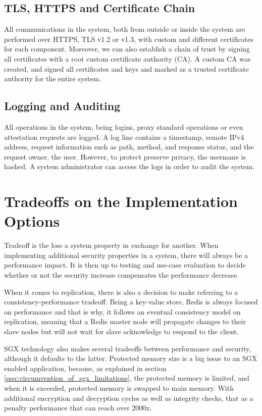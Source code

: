 \subsection{TLS, HTTPS and Certificate Chain}
\label{ssec:tls_https_certificate_chain}

All communications in the system, both from outside or inside the system are performed over \gls{HTTPS}, \gls{TLS} v1.2 or v1.3, with custom and different certificates for each component. Moreover, we can also establish a chain of trust by signing all certificates with a root custom certificate authority (\gls{CA}). A custom \gls{CA} was created, and signed all certificates and keys and marked as a trusted certificate authority for the entire system.

\subsection{Logging and Auditing} 
\label{sec:logging_and_auditing}

All operations in the system, being logins, proxy standard operations or even attestation requests are logged. A log line contains a timestamp, remote \gls{IP}v4 address, request information such as path, method, and response status, and the request owner, the user. However, to protect preserve privacy, the username is hashed. A system administrator can access the logs in order to audit the system.

\section{Tradeoffs on the Implementation Options}
\label{sec:tradeoffs_implementation_options}

Tradeoff is the loss a system property in exchange for another. When implementing additional security properties in a system, there will always be a performance impact. It is then up to testing and use-case evaluation to decide whether or not the security increase compensates the performance decrease.

When it comes to replication, there is also a decision to make referring to a consistency-performance tradeoff. Being a key-value store, Redis is always focused on performance and that is why, it follows an eventual consistency model on replication, meaning that a Redis master node will propagate changes to their slave nodes but will not wait for slave acknowledge to respond to the client.

\gls{SGX} technology also makes several tradeoffs between performance and security, although it defaults to the latter. Protected memory size is a big issue to an \gls{SGX} enabled application, because, as explained in section \ref{ssec:circumvention_of_sgx_limitations}, the protected memory is limited, and when it is exceeded, protected memory is swapped to main memory. With additional encryption and decryption cycles as well as integrity checks, that as a penalty performance that can reach over 2000x. 

